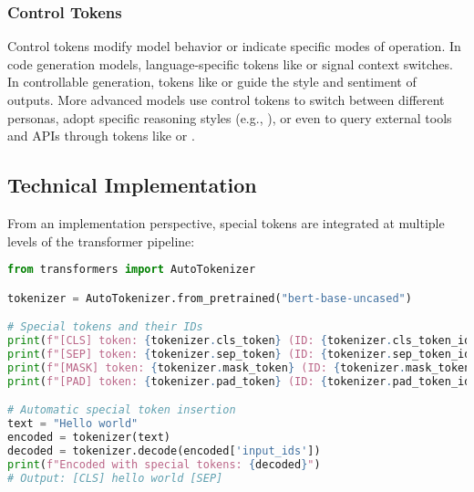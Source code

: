 \subsubsection{Control Tokens}
Control tokens modify model behavior or indicate specific modes of operation. In code generation models, language-specific tokens like  or  signal context switches. In controllable generation, tokens like  or  guide the style and sentiment of outputs. More advanced models use control tokens to switch between different personas, adopt specific reasoning styles (e.g., ), or even to query external tools and APIs through tokens like  or .
\begin{comment}
Feedback: The "Control Tokens" section is a great place to highlight the power and flexibility of special tokens. The examples are good. You could make this even more impactful by mentioning a more advanced or surprising example, if one exists. For instance, "More advanced models use control tokens to switch between different personas, adopt a specific reasoning style (e.g., chain-of-thought), or even to query external tools and APIs." This hints at the cutting-edge applications.

STATUS: addressed - added advanced examples including persona switching, reasoning styles, and tool querying capabilities
\end{comment}

\subsection{Technical Implementation}

From an implementation perspective, special tokens are integrated at multiple levels of the transformer pipeline:

\begin{lstlisting}[language=Python, caption=Tokenizer Configuration]
from transformers import AutoTokenizer

tokenizer = AutoTokenizer.from_pretrained("bert-base-uncased")

# Special tokens and their IDs
print(f"[CLS] token: {tokenizer.cls_token} (ID: {tokenizer.cls_token_id})")
print(f"[SEP] token: {tokenizer.sep_token} (ID: {tokenizer.sep_token_id})")
print(f"[MASK] token: {tokenizer.mask_token} (ID: {tokenizer.mask_token_id})")
print(f"[PAD] token: {tokenizer.pad_token} (ID: {tokenizer.pad_token_id})")

# Automatic special token insertion
text = "Hello world"
encoded = tokenizer(text)
decoded = tokenizer.decode(encoded['input_ids'])
print(f"Encoded with special tokens: {decoded}")
# Output: [CLS] hello world [SEP]
\end{lstlisting}

